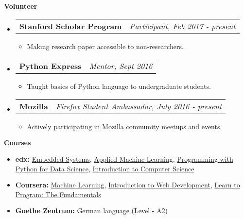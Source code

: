 \documentclass[letterpaper,10pt]{article}
\makeatletter
\newcommand{\resitem}[1]{\item #1 \vspace{-2pt}}
\newcommand{\resheading}[1]{{\large \colorbox{mygrey}{\begin{minipage}{\textwidth}{\textbf{#1 \vphantom{p\^{E}}}}\end{minipage}}}}
\newcommand{\ressubheading}[4]{
\begin{tabular*}{7.0in}{l@{\extracolsep{\fill}}r}
		\textbf{#1} & \textit{#4} \\
\end{tabular*}\vspace{-6pt}}
\makeatother
\begin{document}
\resheading{Volunteer}
\begin{itemize}


\item
	\ressubheading{Stanford Scholar Program}{Remote}{Participant}{Participant, Feb 2017 - present}
	\begin{itemize}
		\resitem{Making research paper accessible to non-researchers.}
	\end{itemize}

\item
	\ressubheading{Python Express}{Remote}{Mentor}{Mentor, Sept 2016}
	\begin{itemize}
		\resitem{Taught basics of Python language to undergraduate students.}
	\end{itemize}
	
\item
	\ressubheading{Mozilla}{Remote}{Firefox Student Ambassador}{Firefox Student Ambassador, July 2016 - present}
	\begin{itemize}
		\resitem{Actively participating in Mozilla community meetups and events.}
	\end{itemize}
	
	
\end{itemize}

\resheading{Courses}
    \begin{itemize}
        \item \textbf{edx:}
        \href{https://www.edx.org/course/embedded-systems-shape-world-utaustinx-ut-6-03x} {Embedded Systems},
        \href{https://courses.edx.org/courses/course-v1:Microsoft+DAT203.3x+5T2016/info}{Applied Machine Learning},
        \href{https://courses.edx.org/courses/course-v1:Microsoft+DAT210x+6T2016/info}{Programming with Python for Data Science},
        \href{https://www.edx.org/course/introduction-computer-science-harvardx-cs50x}{Introduction to Computer Science}
        \item \textbf{Coursera:}                            \href{https://www.coursera.org/learn/machine-learning}{Machine Learning},
        \href{https://www.coursera.org/learn/web-development/home/welcome}{Introduction to Web Development},
        \href{https://www.coursera.org/learn/learn-to-program}{Learn to Program: The Fundamentals}
        \item \textbf{Goethe Zentrum:} German language (Level - A2)
    \end{itemize}
    
\end{document}
